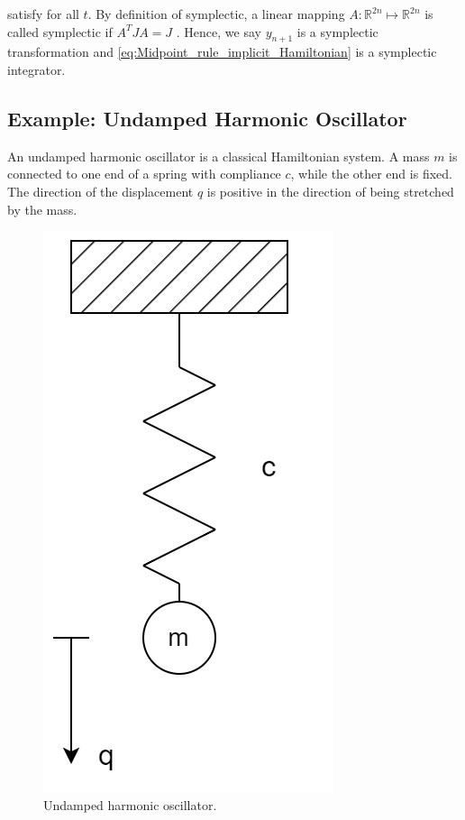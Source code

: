 \documentclass[
	parskip, 			   %
	twoside, 			   %
	DIV=14, 			   %
	BCOR=15.0mm, 		   %
	headsepline, 		   %
	open=right, 		   %
	captions=tableheading, %
	bibliography=totoc,    %
	numbers=noenddot       %
]{scrreprt}
\begin{document}
satisfy for all $t$. By definition of symplectic, a linear mapping $A: \mathbb{R}^{2n} \mapsto \mathbb{R}^{2n}$ is called symplectic if $A^T J A = J$ \cite{hairer2006geometric}. Hence, we say $y_{n+1}$ is a symplectic transformation and \ref{eq:Midpoint_rule_implicit_Hamiltonian} is a symplectic integrator.


\subsection{Example: Undamped Harmonic Oscillator}
An undamped harmonic oscillator is a classical Hamiltonian system. A mass $m$ is connected to one end of a spring with compliance $c$, while the other end is fixed. The direction of the displacement $q$ is positive in the direction of being stretched by the mass.

\clearpage
\begin{figure}[h!]
    \centering
    \includegraphics[scale=0.3]{figures/undamped harmonic oscillator.jpg}
    \caption{Undamped harmonic oscillator.}
    \label{fig:physical_model_undamped_harmonic_oscillator}
\end{figure}
\end{document}
